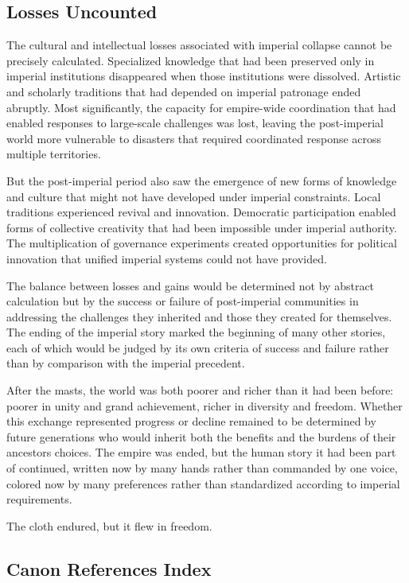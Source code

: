 \subsection{Losses Uncounted}\label{losses-uncounted}

The cultural and intellectual losses associated with imperial collapse
cannot be precisely calculated. Specialized knowledge that had been
preserved only in imperial institutions disappeared when those
institutions were dissolved. Artistic and scholarly traditions that had
depended on imperial patronage ended abruptly. Most significantly, the
capacity for empire-wide coordination that had enabled responses to
large-scale challenges was lost, leaving the post-imperial world more
vulnerable to disasters that required coordinated response across
multiple territories.

But the post-imperial period also saw the emergence of new forms of
knowledge and culture that might not have developed under imperial
constraints. Local traditions experienced revival and innovation.
Democratic participation enabled forms of collective creativity that had
been impossible under imperial authority. The multiplication of
governance experiments created opportunities for political innovation
that unified imperial systems could not have provided.

The balance between losses and gains would be determined not by abstract
calculation but by the success or failure of post-imperial communities
in addressing the challenges they inherited and those they created for
themselves. The ending of the imperial story marked the beginning of
many other stories, each of which would be judged by its own criteria of
success and failure rather than by comparison with the imperial
precedent.

After the masts, the world was both poorer and richer than it had been
before: poorer in unity and grand achievement, richer in diversity and
freedom. Whether this exchange represented progress or decline remained
to be determined by future generations who would inherit both the
benefits and the burdens of their ancestors\textquotesingle{} choices.
The empire was ended, but the human story it had been part of continued,
written now by many hands rather than commanded by one voice, colored
now by many preferences rather than standardized according to imperial
requirements.

The cloth endured, but it flew in freedom.

\subsection{Canon References Index}\label{canon-references-index}

